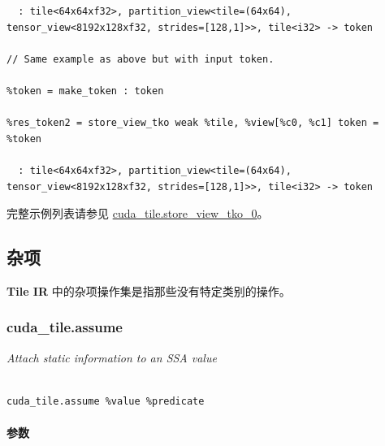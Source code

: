 \documentclass{article}
\begin{document}
\begin{itemize}
\begin{lstlisting}
  : tile<64x64xf32>, partition_view<tile=(64x64), tensor_view<8192x128xf32, strides=[128,1]>>, tile<i32> -> token

// Same example as above but with input token.

%token = make_token : token

%res_token2 = store_view_tko weak %tile, %view[%c0, %c1] token = %token

  : tile<64x64xf32>, partition_view<tile=(64x64), tensor_view<8192x128xf32, strides=[128,1]>>, tile<i32> -> token

\end{lstlisting}



\end{itemize}
完整示例列表请参见 \href{https://docs.nvidia.com/cuda/tile-ir/latest/sections/appendix.html#example-cuda-tile-store-view-tko-0}{cuda\_tile.store\_view\_tko\_0}。







\subsection{杂项}


\textbf{Tile IR} 中的杂项操作集是指那些没有特定类别的操作。



\subsubsection{cuda\_tile.assume}


\textit{Attach static information to an SSA value}




\begin{lstlisting}

cuda_tile.assume %value %predicate

\end{lstlisting}



\paragraph{参数}
\end{document}
